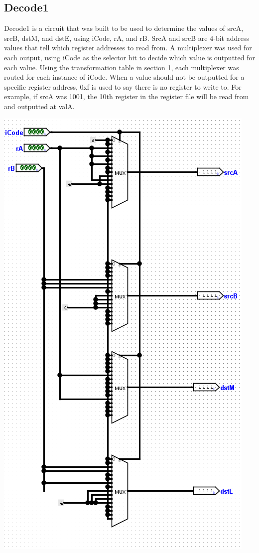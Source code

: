 \documentclass{article}
\begin{document}
\subsection{Decode1}
Decode1 is a circuit that was built to be used to determine the values of srcA, srcB, dstM, and dstE, using iCode, rA, and rB. SrcA and srcB are 4-bit address values that tell which register addresses to read from. A multiplexer was used for each output, using iCode as the selector bit to decide which value is outputted for each value. Using the transformation table in section 1, each multiplexer was routed for each instance of iCode. When a value should not be outputted for a specific register address, 0xf is used to say there is no register to write to. For example, if srcA was 1001, the 10th register in the register file will be read from and outputted at valA.
\begin{center}
    \includegraphics[scale=.6]{decode1.png} \\
\end{center}
\end{document}
